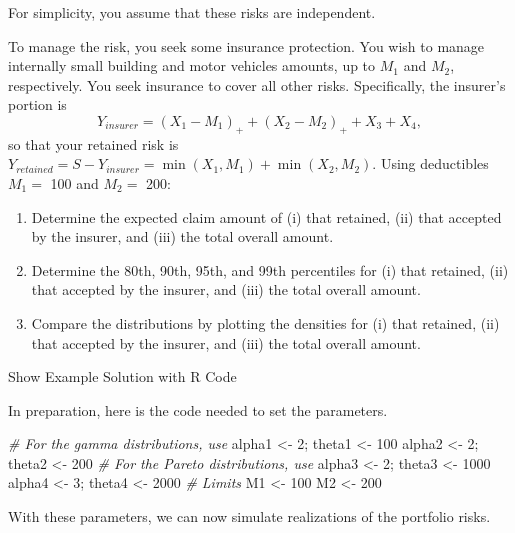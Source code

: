 \documentclass[]{book}
\newenvironment{Shaded}{\begin{snugshade}}{\end{snugshade}}
\newcommand{\DecValTok}[1]{\textcolor[rgb]{0.00,0.00,0.81}{#1}}
\newcommand{\StringTok}[1]{\textcolor[rgb]{0.31,0.60,0.02}{#1}}
\newcommand{\CommentTok}[1]{\textcolor[rgb]{0.56,0.35,0.01}{\textit{#1}}}
\newcommand{\NormalTok}[1]{#1}
\providecommand{\tightlist}{%
  \setlength{\itemsep}{0pt}\setlength{\parskip}{0pt}}
\theoremstyle{definition}
\theoremstyle{definition}
\theoremstyle{definition}
\theoremstyle{remark}
\begin{document}
For simplicity, you assume that these risks are independent.

To manage the risk, you seek some insurance protection. You wish to
manage internally small building and motor vehicles amounts, up to
\(M_1\) and \(M_2\), respectively. You seek insurance to cover all other
risks. Specifically, the insurer's portion is
\[ Y_{insurer} = (X_1 - M_1)_+ + (X_2 - M_2)_+ + X_3 + X_4 ,\] so that
your retained risk is
\(Y_{retained}= S- Y_{insurer} = \min(X_1,M_1) + \min(X_2,M_2)\). Using
deductibles \(M_1=\) 100 and \(M_2=\) 200:

\begin{enumerate}
\def\labelenumi{\alph{enumi}.}
\tightlist
\item
  Determine the expected claim amount of (i) that retained, (ii) that
  accepted by the insurer, and (iii) the total overall amount.
\item
  Determine the 80th, 90th, 95th, and 99th percentiles for (i) that
  retained, (ii) that accepted by the insurer, and (iii) the total
  overall amount.
\item
  Compare the distributions by plotting the densities for (i) that
  retained, (ii) that accepted by the insurer, and (iii) the total
  overall amount.
\end{enumerate}

Show Example Solution with R Code

\hypertarget{togglePortMgtExample}{}
In preparation, here is the code needed to set the parameters.

\begin{Shaded}
\begin{Highlighting}[]
\CommentTok{# For the gamma distributions, use}
\NormalTok{alpha1 <-}\StringTok{ }\DecValTok{2}\NormalTok{;      theta1 <-}\StringTok{ }\DecValTok{100}
\NormalTok{alpha2 <-}\StringTok{ }\DecValTok{2}\NormalTok{;      theta2 <-}\StringTok{ }\DecValTok{200}
\CommentTok{# For the Pareto distributions, use}
\NormalTok{alpha3 <-}\StringTok{ }\DecValTok{2}\NormalTok{;      theta3 <-}\StringTok{ }\DecValTok{1000}
\NormalTok{alpha4 <-}\StringTok{ }\DecValTok{3}\NormalTok{;      theta4 <-}\StringTok{ }\DecValTok{2000}
\CommentTok{# Limits}
\NormalTok{M1     <-}\StringTok{ }\DecValTok{100}
\NormalTok{M2     <-}\StringTok{ }\DecValTok{200}
\end{Highlighting}
\end{Shaded}

With these parameters, we can now simulate realizations of the portfolio
risks.
\end{document}
